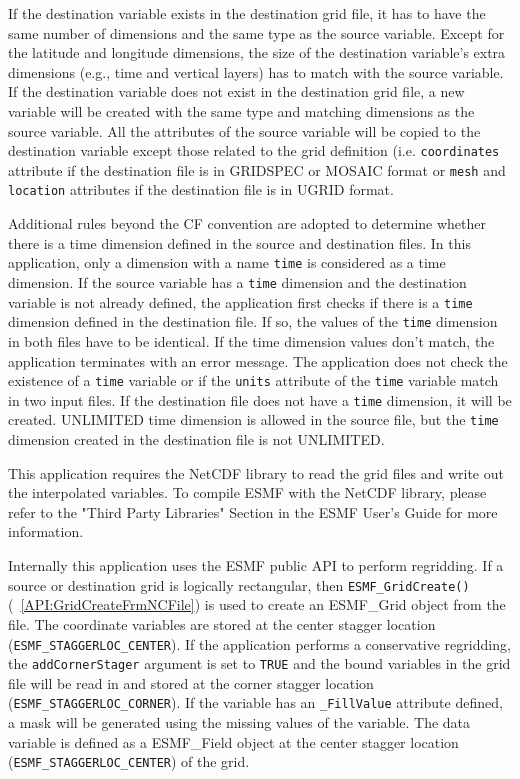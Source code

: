 If the destination 
variable exists in the destination grid file, it has to have the same number of dimensions and the same type as the source variable. Except for the latitude and longitude dimensions, the size of 
the destination variable's extra dimensions (e.g., time and vertical layers) has to match with the 
source variable.   If the destination variable does not exist in the destination grid file, a
new variable will be created with the same type and matching dimensions as the source variable.
All the attributes of the source variable will be copied to the destination variable except those
related to the grid definition (i.e. {\tt coordinates} attribute if the destination file is in  
GRIDSPEC or MOSAIC format or {\tt mesh} and {\tt location} attributes if the destination file is in UGRID format.

Additional rules beyond the CF convention are adopted to determine whether there is a time dimension defined
in the source and destination files.  In this application, only a dimension with a name {\tt time} is 
considered as a time dimension.
If the source variable has a {\tt time} dimension and the destination variable is not already defined, 
the application first checks if there is a {\tt time} dimension defined in the destination file.  If so, 
the values of the {\tt time} dimension in both files have to be identical.  If the time dimension values don't match, the application
terminates with an error message.  The application does not check the existence of a {\tt time} variable 
or if the {\tt units} attribute of the {\tt time} variable match in two input files.  If the destination 
file does not have a {\tt time} dimension, it will be created.  UNLIMITED time dimension is allowed in the
source file, but the {\tt time} dimension created in the destination file is not UNLIMITED.

This application requires the NetCDF library to read the grid files and write out the interpolated variables.  To compile ESMF with
the NetCDF library, please refer to the "Third Party Libraries" Section in the ESMF User's Guide for more information.

Internally this application uses the ESMF public API to perform regridding.
If a source or destination grid is logically rectangular, then {\tt ESMF\_GridCreate()}(~\ref{API:GridCreateFrmNCFile}) is used to create an ESMF\_Grid object from the file. The coordinate variables are stored
at the center stagger location ({\tt ESMF\_STAGGERLOC\_CENTER}).  If the application performs a 
conservative regridding, the {\tt addCornerStager} argument is set to {\tt TRUE} and the bound variables in the grid file will
be read  in and stored at the corner stagger location ({\tt ESMF\_STAGGERLOC\_CORNER}).  If the variable has an {\tt \_FillValue} attribute defined, a mask will be generated using the missing values of the variable. 
The data variable is defined as a ESMF\_Field object at the center stagger location ({\tt ESMF\_STAGGERLOC\_CENTER}) of the grid.   

